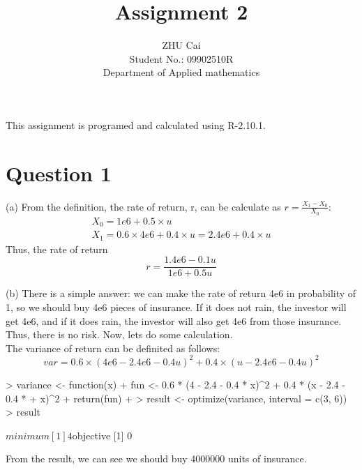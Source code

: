 \documentclass[a4paper,12pt]{article}
\title{Assignment 2}
\author{ZHU Cai\\
Student No.: 09902510R\\
Department of Applied mathematics}
\begin{document}
\maketitle
This assignment is programed and calculated using R-2.10.1.\\
\section*{Question 1}
\noindent (a) From the definition, the rate of return, r, can be calculate as $r = \frac{X_1-X_0}{X_0}$:
\begin{gather}
X_0 = 1e6 + 0.5\times u\\
X_1 = 0.6\times4e6 + 0.4\times u = 2.4e6 + 0.4\times u
\end{gather}
Thus, the rate of return
\begin{equation}
r = \frac{1.4e6 - 0.1u}{1e6 + 0.5u}
\end{equation}

\noindent (b) There is a simple answer: we can make the rate of return 4e6 in probability of
1, so we should buy 4e6 pieces of insurance. If it does not rain, the investor will get 4e6,
and if it does rain, the investor will also get 4e6 from those insurance. Thus, there is
no risk. Now, lets do some calculation.\\
The variance of return can be definited as follows:\\
\begin{equation}
var = 0.6\times(4e6-2.4e6-0.4u)^2 + 0.4\times(u-2.4e6-0.4u)^2
\end{equation}
\begin{Schunk}
\begin{Sinput}
> variance <- function(x) {
+     fun <- 0.6 * (4 - 2.4 - 0.4 * x)^2 + 0.4 * (x - 2.4 - 0.4 * 
+         x)^2
+     return(fun)
+ }
> result <- optimize(variance, interval = c(3, 6))
> result
\end{Sinput}
\begin{Soutput}
$minimum
[1] 4

$objective
[1] 0
\end{Soutput}
\end{Schunk}
From the result, we can see we should buy 4000000 units of insurance.
\end{document}
